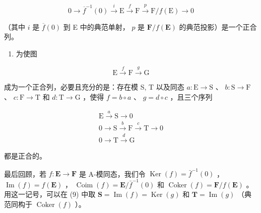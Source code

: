 \[
0 \longrightarrow \overline {{f}} ^ {- 1} (0) \stackrel {i} {\longrightarrow} \mathrm{E} \stackrel {f} {\longrightarrow} \mathrm{F} \stackrel {p} {\longrightarrow} \mathrm{F} / f (\mathrm{E}) \longrightarrow 0\tag{7}
\]

（其中 \(i\) 是 \(\overline{f}(0)\) 到 E 中的典范单射， \(p\) 是 \(\mathbf{F} / f(\mathbf{E})\) 的典范投影）是一个正合列。

\begin{enumerate}
\def\labelenumi{(\alph{enumi})}
\setcounter{enumi}{5}
\tightlist
\item
  为使图
\end{enumerate}

\[
\mathrm{E} \xrightarrow {f} \mathrm{F} \xrightarrow {g} \mathrm{G}\tag{8}
\]

成为一个正合列，必要且充分的是：存在模 S, T 以及同态 \(a: \mathrm{E} \to \mathrm{S}\) 、 \(b: \mathrm{S} \to \mathrm{F}\) 、 \(c: \mathrm{F} \to \mathrm{T}\) 和 \(d: \mathrm{T} \to \mathrm{G}\) ，使得 \(f = b \circ a\) 、 \(g = d \circ c\) ，且三个序列

\[
\begin{array}{c} \mathrm{E} \xrightarrow {a} \mathrm{S} \longrightarrow 0 \\ 0 \longrightarrow \mathrm{S} \xrightarrow {b} \mathrm{F} \xrightarrow {c} \mathrm{T} \longrightarrow 0 \\ 0 \longrightarrow \mathrm{T} \xrightarrow {d} \mathrm{G} \end{array}\tag{9}
\]

都是正合的。

最后回顾，若 \(f: \mathbf{E} \to \mathbf{F}\) 是 A-模同态，我们令 \(\operatorname{Ker}(f) = \bar{f}^{-1}(0)\) ， \(\operatorname{Im}(f) = f(\mathbf{E})\) ， \(\operatorname{Coim}(f) = \mathbf{E} / \bar{f}^{-1}(0)\) 和 \(\operatorname{Coker}(f) = \mathbf{F} / f(\mathbf{E})\) 。用这一记号，可以在 (9) 中取 \(\mathbf{S} = \operatorname{Im}(f) = \operatorname{Ker}(g)\) 和 \(\mathbf{T} = \operatorname{Im}(g)\) （典范同构于 \(\operatorname{Coker}(f)\) ）。

